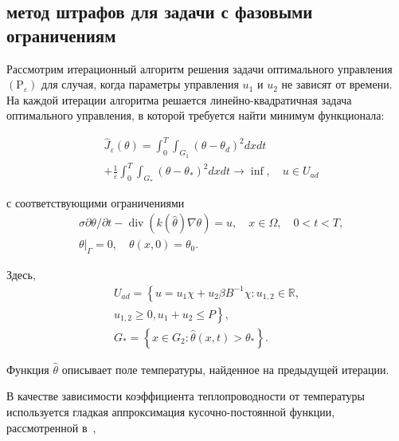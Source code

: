 
\subsection{метод штрафов для задачи с фазовыми ограничениям}
\label{subsec:ch4/sec3/subsec5}


Рассмотрим итерационный алгоритм решения задачи оптимального управления
$\left(\mathrm{P}_{\varepsilon}\right)$ для случая, когда параметры управления
$u_{1}$ и $u_{2}$ не зависят от времени.
На каждой итерации алгоритма
решается линейно-квадратичная задача оптимального управления,
в которой требуется найти минимум функционала:

\begin{equation}
    \label{eq:3_2:9}
    \begin{aligned}
        &\widehat{J}_{\varepsilon}(\theta)=\int_{0}^{T}
        \int_{G_{1}}\left(\theta-\theta_{d}\right)^{2} d x d t \\
        &+\frac{1}{\varepsilon} \int_{0}^{T}
        \int_{G_{*}}\left(\theta-\theta_{*}\right)^{2} d x d t
        \rightarrow \inf , \quad u \in U_{a d}
    \end{aligned}
\end{equation}

с соответствующими ограничениями
\begin{equation}
    \label{eq:3_2:10}
    \begin{aligned}
        &\sigma \partial \theta / \partial t-\operatorname{div}(k(\widehat{\theta})
        \nabla \theta)=u, \quad x \in \Omega, \quad 0<t<T, \\
        &\left.\theta\right|_{\Gamma}=0, \quad \theta(x, 0)=\theta_{0}.
    \end{aligned}
\end{equation}

Здесь,
\[
    \begin{gathered}
        U_{a d}=\left\{u=u_{1} \chi+u_{2} \beta B^{-1} \chi: u_{1,2} \in \mathbb{R},\right. \\
        \left.u_{1,2} \geq 0, u_{1}+u_{2} \leq P\right\}, \\
        G_{*}=\left\{x \in G_{2}: \hat{\theta}(x, t)>\theta_{*}\right\}.
    \end{gathered}
\]

Функция $\widehat{\theta}$ описывает поле температуры,
найденное на предыдущей итерации.

В качестве зависимости коэффициента теплопроводности от температуры используется
гладкая аппроксимация кусочно-постоянной функции, рассмотренной
в~\cite{Opticalthermal_vanRuijven2014, Some_Poluektova2014, Endovenous_Malskat2014},


